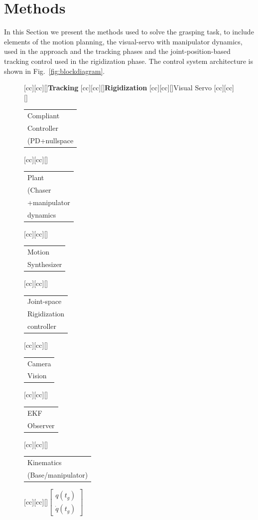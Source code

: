 \section{Methods}
\label{sec:methods}
%
In this Section we present the methods used to solve the grasping task, to include elements of the motion planning, the visual-servo with manipulator dynamics, used in the approach and the tracking phases and the joint-position-based tracking control used in the rigidization phase. The control system architecture is shown in Fig.~\ref{fig:blockdiagram}.
%
\begin{figure}
[cc][cc][\FontFigS]{\textbf{Tracking}}
[cc][cc][\FontFigS]{\textbf{Rigidization}}
[cc][cc][\FontFigS]{Visual Servo}
[cc][cc][\FontFigS]{\small{\begin{tabular}{@{}l@{}} Compliant\\Controller\\(PD+nullspace\end{tabular}}}
[cc][cc][\FontFigS]{\small{\begin{tabular}{@{}l@{}} Plant\\(Chaser\\+manipulator\\dynamics\end{tabular}}}
[cc][cc][\FontFigS]{{\begin{tabular}{@{}l@{}} Motion\\Synthesizer \end{tabular}}}
[cc][cc][\FontFigS]{\small{\begin{tabular}{@{}l@{}} Joint-space\\Rigidization\\controller \end{tabular}}}
[cc][cc][\FontFigS]{\small{\begin{tabular}{@{}l@{}} Camera\\Vision \end{tabular}}}
[cc][cc][\FontFigS]{\small{\begin{tabular}{@{}l@{}} EKF\\Observer \end{tabular}}}
[cc][cc][\FontFigS]{\small{\begin{tabular}{@{}l@{}} Kinematics\\(Base/manipulator) \end{tabular}}}
[cc][cc][\FontFigS]{\small{$\begin{bmatrix}q(t_g)\\ \dot{q}(t_g)\end{bmatrix}$}}

\end{figure}
